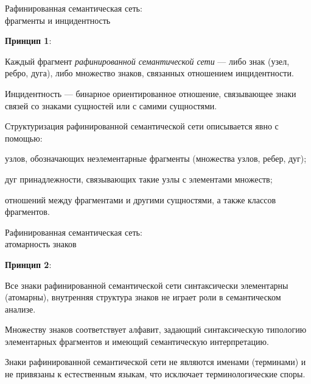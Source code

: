 \begin{frame}{Рафинированная семантическая сеть:\\фрагменты и инцидентность}
	\topline
	\justifying
	
	\footnotesize
	
	\textbf{Принцип 1}:
	\begin{textitemize}
		\item Каждый фрагмент \textit{рафинированной семантической сети} --- либо знак (узел, ребро, дуга), либо множество знаков, связанных отношением инцидентности.
		\item Инцидентность --- бинарное ориентированное отношение, связывающее знаки связей со знаками сущностей или с самими сущностями.
	\end{textitemize}
	
	\medskip
	Структуризация рафинированной семантической сети описывается явно с помощью:
	\begin{textitemize}
		\item узлов, обозначающих неэлементарные фрагменты (множества узлов, ребер, дуг);
		\item дуг принадлежности, связывающих такие узлы с элементами множеств;
		\item отношений между фрагментами и другими сущностями, а также классов фрагментов.
	\end{textitemize}
	
\end{frame}


\begin{frame}{Рафинированная семантическая сеть:\\атомарность знаков}
	\topline
	\justifying
	
	\textbf{Принцип 2}:
	\begin{textitemize}
		\item Все знаки рафинированной семантической сети синтаксически элементарны (атомарны), внутренняя структура знаков не играет роли в семантическом анализе.
		\item Множеству знаков соответствует алфавит, задающий синтаксическую типологию элементарных фрагментов и имеющий семантическую интерпретацию.
	\end{textitemize}
	
	\medskip
	Знаки рафинированной семантической сети не являются именами (терминами) и не привязаны к естественным языкам, что исключает терминологические споры.
	
\end{frame}


